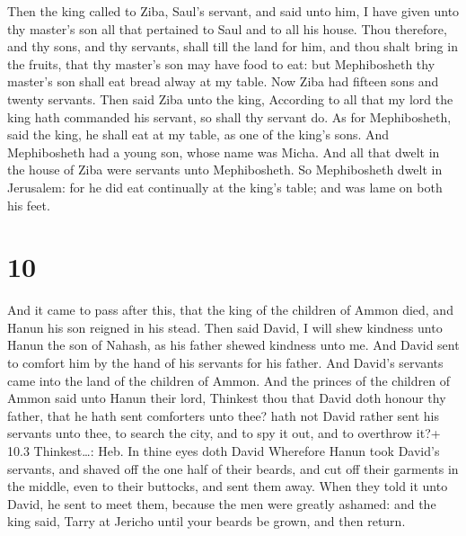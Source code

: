  Then the king called to Ziba, Saul's servant, and said
unto him, I have given unto thy master's son all that pertained to Saul
and to all his house.  Thou therefore, and thy sons, and
thy servants, shall till the land for him, and thou shalt bring in the
fruits, that thy master's son may have food to eat: but Mephibosheth thy
master's son shall eat bread alway at my table. Now Ziba had fifteen
sons and twenty servants.  Then said Ziba unto the king,
According to all that my lord the king hath commanded his servant, so
shall thy servant do. As for Mephibosheth, said the king, he shall eat
at my table, as one of the king's sons.  And Mephibosheth
had a young son, whose name was Micha. And all that dwelt in the house
of Ziba were servants unto Mephibosheth.  So Mephibosheth
dwelt in Jerusalem: for he did eat continually at the king's table; and
was lame on both his feet.

\hypertarget{section-9}{%
\section{10}\label{section-9}}

 And it came to pass after this, that the king of the
children of Ammon died, and Hanun his son reigned in his stead.
 Then said David, I will shew kindness unto Hanun the son of
Nahash, as his father shewed kindness unto me. And David sent to comfort
him by the hand of his servants for his father. And David's servants
came into the land of the children of Ammon.  And the
princes of the children of Ammon said unto Hanun their lord, Thinkest
thou that David doth honour thy father, that he hath sent comforters
unto thee? hath not David rather sent his servants unto thee, to search
the city, and to spy it out, and to overthrow it?+ 10.3 Thinkest\ldots:
Heb. In thine eyes doth David  Wherefore Hanun took David's
servants, and shaved off the one half of their beards, and cut off their
garments in the middle, even to their buttocks, and sent them away.
 When they told it unto David, he sent to meet them, because
the men were greatly ashamed: and the king said, Tarry at Jericho until
your beards be grown, and then return.

